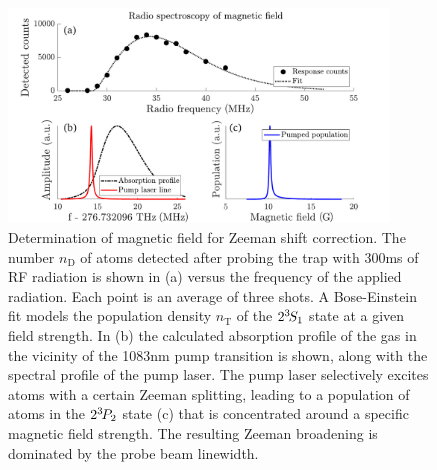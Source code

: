 \begin{figure}
	\centering
  \includegraphics[width=0.9\textwidth]{fig/spectroscopy/rf_spec_subfig-eps-converted-to.pdf}
  \caption{Determination of magnetic field for Zeeman shift correction.
	The number $n_\text{D}$ of atoms detected after probing the trap with 300ms of RF radiation is shown in (a) versus the frequency of the applied radiation.
	Each point is an average of three shots.
	A Bose-Einstein fit models the population density $n_\text{T}$ of the $2^{3\!} S_1$ state at a given field strength.
	In (b) the calculated absorption profile of the gas in the vicinity of the 1083nm pump transition is shown, along with the spectral profile of the pump laser.
	The pump laser selectively excites atoms with a certain Zeeman splitting, leading to a population of atoms in the $2^{3\!} P_2$ state (c) that is concentrated around a specific magnetic field strength.
	The resulting Zeeman broadening is dominated by the probe beam linewidth.}
  \label{fig:RF_spec}
\end{figure}



